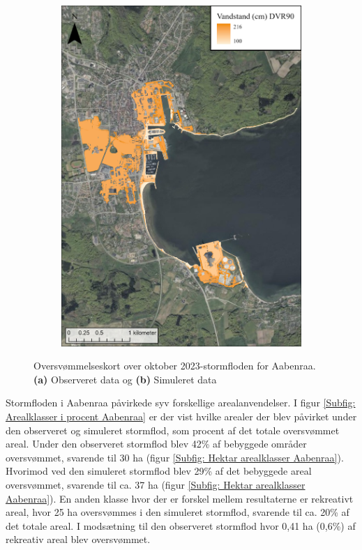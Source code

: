 \begin{figure}[H]
\begin{subfigure}[t]{0.5\textwidth}
        \includegraphics[width=0.95\linewidth]{images/Resultater/2023Model/2023 model_aabenraa.jpg}
        \caption{}
        \label{Subfig: Model Aabenraa}
    \end{subfigure}
    \caption{Oversvømmelseskort over oktober 2023-stormfloden for Aabenraa. \textbf{(a)} Observeret data og \textbf{(b)} Simuleret data}
    \label{Figur: Målt & simuleret Aabenraa}
\end{figure}
Stormfloden i Aabenraa påvirkede syv forskellige arealanvendelser. I figur \ref{Subfig: Arealklasser i procent Aabenraa} er der vist hvilke arealer der blev påvirket under den observeret og simuleret stormflod, som procent af det totale oversvømmet areal. Under den observeret stormflod blev 42\% af bebyggede områder oversvømmet, svarende til 30 ha (figur \ref{Subfig: Hektar arealklasser Aabenraa}). Hvorimod ved den simuleret stormflod blev 29\% af det bebyggede areal oversvømmet, svarende til ca. 37 ha (figur \ref{Subfig: Hektar arealklasser Aabenraa}). En anden klasse hvor der er forskel mellem resultaterne er rekreativt areal, hvor 25 ha oversvømmes i den simuleret stormflod, svarende til ca. 20\% af det totale areal. I modsætning til den observeret stormflod hvor 0,41 ha (0,6\%) af rekreativ areal blev oversvømmet.
